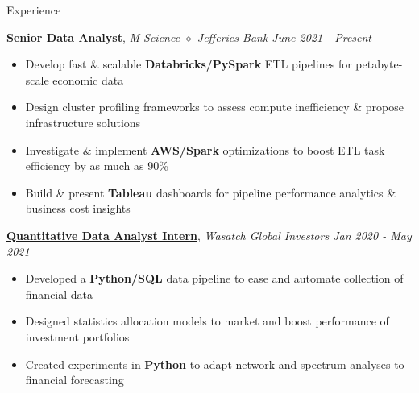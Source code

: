 \documentclass{resume/resume}
\begin{document}
\begin{rSection}{Experience}

    \href{https://mscience.com/}{\bf Senior Data Analyst}, {\em M Science $\diamond$ Jefferies Bank \hfill June 2021 - Present}
    \vspace{-6pt}
    \begin{itemize}[nosep]
        \item Develop fast \& scalable {\bf Databricks/PySpark} ETL pipelines for petabyte-scale economic data
        \item Design cluster profiling frameworks to assess compute inefficiency \& propose infrastructure solutions
        \item Investigate \& implement {\bf AWS/Spark} optimizations to boost ETL task efficiency by as much as 90\%
        \item Build \& present {\bf Tableau} dashboards for pipeline performance analytics \& business cost insights
    \end{itemize}

    \href{https://wasatchglobal.com/}{\bf Quantitative Data Analyst Intern}, {\em Wasatch Global Investors \hfill Jan 2020 - May 2021}
    \vspace{-6pt}
    \begin{itemize}[nosep]
        \item Developed a {\bf Python/SQL} data pipeline to ease and automate collection of financial data
        \item Designed statistics allocation models to market and boost performance of investment portfolios
        \item Created experiments in {\bf Python} to adapt network and spectrum analyses to financial forecasting
    \end{itemize}


\end{rSection}
\end{document}

